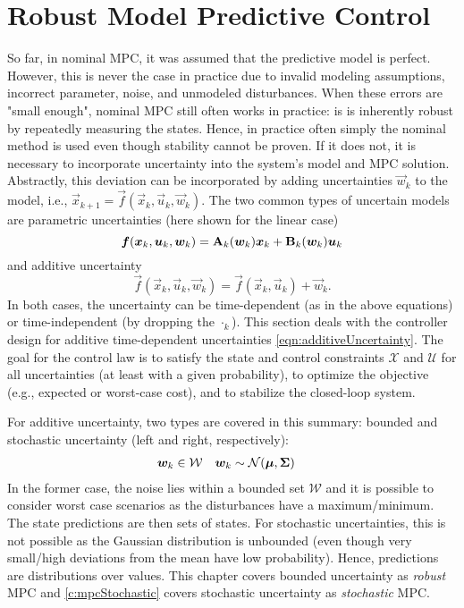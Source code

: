 \chapter{Robust Model Predictive Control}
	\label{c:mpcRobust}

	So far, in nominal MPC, it was assumed that the predictive model is perfect. However, this is never the case in practice due to invalid modeling assumptions, incorrect parameter, noise, and unmodeled disturbances. When these errors are "small enough", nominal MPC still often works in practice: is is inherently robust by repeatedly measuring the states. Hence, in practice often simply the nominal method is used even though stability cannot be proven. If it does not, it is necessary to incorporate uncertainty into the system's model and MPC solution. Abstractly, this deviation can be incorporated by adding uncertainties \(\vec{w}_k\) to the model, i.e., \( \vec{x}_{k + 1} = \vec{f}(\vec{x}_k, \vec{u}_k, \vec{w}_k) \). The two common types of uncertain models are parametric uncertainties (here shown for the linear case)
	\begin{equation}
		\bm{f}(\bm{x}_k, \bm{u}_k, \bm{w}_k) = \bm{\mathrm{A}}_k(\bm{w}_k) \bm{x}_k + \bm{\mathrm{B}}_k(\bm{w}_k) \bm{u}_k
	\end{equation}
	and additive uncertainty
	\begin{equation}
		\vec{f}(\vec{x}_k, \vec{u}_k, \vec{w}_k) = \vec{f}(\vec{x}_k, \vec{u}_k) + \vec{w}_k.  \label{eqn:additiveUncertainty}
	\end{equation}
	In both cases, the uncertainty can be time-dependent (as in the above equations) or time-independent (by dropping the \(\cdot_k\)). This section deals with the controller design for additive time-dependent uncertainties \eqref{eqn:additiveUncertainty}. The goal for the control law is to satisfy the state and control constraints \(\mathcal{X}\) and \(\mathcal{U}\) for all uncertainties (at least with a given probability), to optimize the objective (e.g., expected or worst-case cost), and to stabilize the closed-loop system.

	For additive uncertainty, two types are covered in this summary: bounded and stochastic uncertainty (left and right, respectively):
	\begin{align}
		\bm{w}_k &\in \mathcal{W} &
		\bm{w}_k &\sim \mathcal{N}(\bm{\mu}, \bm{\mathrm{\Sigma}})
	\end{align}
	In the former case, the noise lies within a bounded set \(\mathcal{W}\) and it is possible to consider worst case scenarios as the disturbances have a maximum/minimum. The state predictions are then sets of states. For stochastic uncertainties, this is not possible as the Gaussian distribution is unbounded (even though very small/high deviations from the mean have low probability). Hence, predictions are distributions over values. This chapter covers bounded uncertainty as \emph{robust} MPC and \autoref{c:mpcStochastic} covers stochastic uncertainty as \emph{stochastic} MPC.

